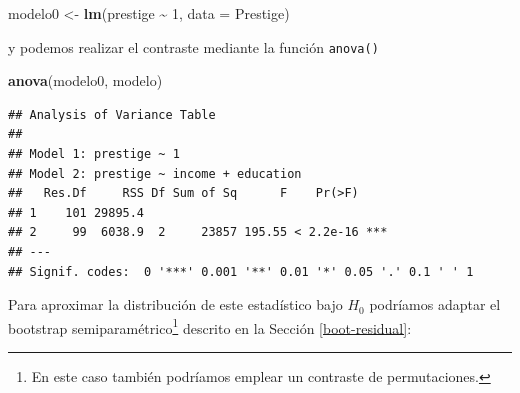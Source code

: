 \documentclass[
]{book}
\newenvironment{Shaded}{\begin{snugshade}}{\end{snugshade}}
\newcommand{\AttributeTok}[1]{\textcolor[rgb]{0.13,0.29,0.53}{#1}}
\newcommand{\DecValTok}[1]{\textcolor[rgb]{0.00,0.00,0.81}{#1}}
\newcommand{\FunctionTok}[1]{\textcolor[rgb]{0.13,0.29,0.53}{\textbf{#1}}}
\newcommand{\NormalTok}[1]{#1}
\newcommand{\OtherTok}[1]{\textcolor[rgb]{0.56,0.35,0.01}{#1}}
\newcommand{\SpecialCharTok}[1]{\textcolor[rgb]{0.81,0.36,0.00}{\textbf{#1}}}
\theoremstyle{break}
\theoremstyle{nonumberplain}
\let\oldfootnote\footnote
\renewcommand\footnote[1]{\oldfootnote{\hspace{2mm}#1}}
\begin{document}
\begin{Shaded}
\begin{Highlighting}[]
\NormalTok{modelo0 }\OtherTok{\textless{}{-}} \FunctionTok{lm}\NormalTok{(prestige }\SpecialCharTok{\textasciitilde{}} \DecValTok{1}\NormalTok{, }\AttributeTok{data =}\NormalTok{ Prestige)}
\end{Highlighting}
\end{Shaded}

y podemos realizar el contraste mediante la función \texttt{anova()}

\begin{Shaded}
\begin{Highlighting}[]
\FunctionTok{anova}\NormalTok{(modelo0, modelo)}
\end{Highlighting}
\end{Shaded}

\begin{verbatim}
## Analysis of Variance Table
## 
## Model 1: prestige ~ 1
## Model 2: prestige ~ income + education
##   Res.Df     RSS Df Sum of Sq      F    Pr(>F)    
## 1    101 29895.4                                  
## 2     99  6038.9  2     23857 195.55 < 2.2e-16 ***
## ---
## Signif. codes:  0 '***' 0.001 '**' 0.01 '*' 0.05 '.' 0.1 ' ' 1
\end{verbatim}

Para aproximar la distribución de este estadístico bajo \(H_0\) podríamos adaptar
el bootstrap semiparamétrico\footnote{En este caso también podríamos emplear un contraste
  de permutaciones.} descrito en la Sección \ref{boot-residual}:
\end{document}

